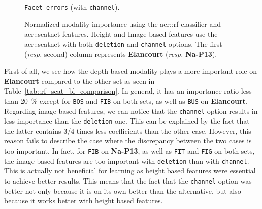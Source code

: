 \begin{figure}[htpb]
{\begin{subfloatrow}[2]
{                        }{
                            \caption{
                                \label{subfig::feature_importances_scat_chan_rf_facet}
                                \texttt{Facet errors} (with \texttt{channel}).
                            }
                        }
                    \end{subfloatrow}
                }{
                    \caption[
                        Normalized modality importance using the \gls{acr::rf} classifier and \gls{acr::scatnet} features.
                    ]{
                        \label{fig::feature_importances_scat_rf}
                        Normalized modality importance using the \gls{acr::rf} classifier and \gls{acr::scatnet} features.
                        Height and Image based features use the \gls{acr::scatnet} with both \texttt{deletion} and \texttt{channel} options.
                        The first (\textit{resp.} second) column represents \textbf{Elancourt} (\textit{resp.} \textbf{Na-P13}).
                    }
                }
            \end{figure}

            First of all, we see how the depth based modality plays a more important role on \textbf{Elancourt} compared to the other set as seen in Table~\ref{tab::rf_scat_bl_comparison}.
            In general, it has an importance ratio less than \SI{20}{\percent} except for \texttt{BOS} and \texttt{FIB} on both sets, as well as \texttt{BUS} on \textbf{Elancourt}.\\

            Regarding image based features, we can notice that the \texttt{channel} option results in less importance than the \texttt{deletion} one.
            This can be explained by the fact that the latter contains 3/4 times less coefficients than the other case.
            However, this reason fails to describe the case where the discrepancy between the two cases is too important.
            In fact, for \texttt{FIB} on \textbf{Na-P13}, as well as \texttt{FIT} and \texttt{FIG} on both sets, the image based features are too important with \texttt{deletion} than with \texttt{channel}.
            This is actually not beneficial for learning as height based features were essential to achieve better results.
            This means that the fact that the \texttt{channel} option was better not only because it is on its own better than the alternative, but also because it works better with height based features.\\


